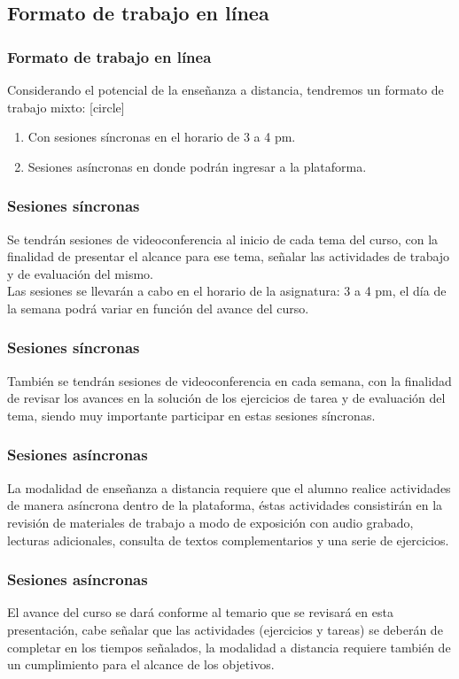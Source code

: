 \subsection{Formato de trabajo en línea}
\begin{frame}
\frametitle{Formato de trabajo en línea}
Considerando el potencial de la enseñanza a distancia, tendremos un formato de trabajo mixto:
[circle]
\begin{enumerate}[<+->]
\item Con sesiones síncronas en el horario de 3 a 4 pm.
\item Sesiones asíncronas en donde podrán ingresar a la plataforma.
\end{enumerate}
\end{frame}
\begin{frame}
\frametitle{Sesiones síncronas}
Se tendrán sesiones de videoconferencia al inicio de cada tema del curso, con la finalidad de presentar el alcance para ese tema, señalar las actividades de trabajo y de evaluación del mismo.
\\
\bigskip
Las sesiones se llevarán a cabo en el horario de la asignatura: 3 a 4 pm, el día de la semana podrá variar en función del avance del curso. 
\end{frame}
\begin{frame}
\frametitle{Sesiones síncronas}
También se tendrán sesiones de videoconferencia en cada semana, con la finalidad de revisar los avances en la solución de los ejercicios de tarea y de evaluación del tema, siendo muy importante participar en estas sesiones síncronas.
\end{frame}
\begin{frame}
\frametitle{Sesiones asíncronas}
La modalidad de enseñanza a distancia requiere que el alumno realice actividades de manera asíncrona dentro de la plataforma, éstas actividades consistirán en la revisión de materiales de trabajo a modo de exposición con audio grabado, lecturas adicionales, consulta de textos complementarios y una serie de ejercicios.
\end{frame}
\begin{frame}
\frametitle{Sesiones asíncronas}
El avance del curso se dará conforme al temario que se revisará en esta presentación, cabe señalar que las actividades (ejercicios y tareas) se deberán de completar en los tiempos señalados, la modalidad a distancia requiere también de un cumplimiento para el alcance de los objetivos.
\end{frame}
{

}
